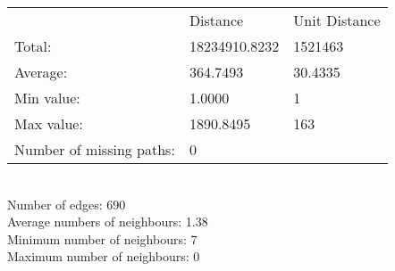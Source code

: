\begin{tabular}{lll}
 & Distance & Unit Distance\\
Total: & 18234910.8232 & 1521463\\
Average: & 364.7493 & 30.4335\\
Min value: & 1.0000 & 1\\
Max value: & 1890.8495 & 163\\
\hline
Number of missing paths: & 0 &\\
\end{tabular}\\
Number of edges: 690\\
Average numbers of neighbours: 1.38\\
Minimum number of neighbours: 7\\
Maximum number of neighbours: 0\\
